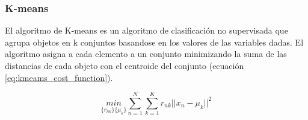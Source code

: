 \subsubsection{K-means \label{sec:kmeans}}

El algoritmo de K-means es un algoritmo de clasificación no supervisada que agrupa objetos en k conjuntos basandose en los valores de las variables dadas. El algoritmo asigna a cada elemento a un conjunto minimizando la suma de las distancias de cada objeto con el centroide del conjunto (ecuación \ref{eq:kmeams_cost_function}).

\begin{equation}
    \underset{\{r_{nk}\}\{\mu_k\}}{min} \sum_{n=1}^N \sum_{k=1}^K r_{nk} ||x_n-\mu_k||^2
    \label{eq:kmeams_cost_function}
\end{equation}